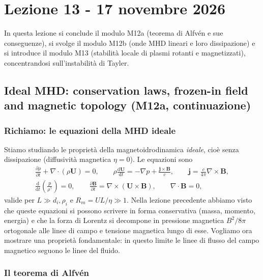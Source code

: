 \chapter{Lezione 13 - 17 novembre 2026}

In questa lezione si conclude il modulo M12a (teorema di Alfvén e sue conseguenze), si svolge il modulo M12b (onde MHD lineari e loro dissipazione) e si introduce il modulo M13 (stabilità locale di plasmi rotanti e magnetizzati), concentrandosi sull'instabilità di Tayler.

\section{Ideal MHD: conservation laws, frozen-in field and magnetic topology (M12a, continuazione)}

\subsection{Richiamo: le equazioni della MHD ideale}

Stiamo studiando le proprietà della magnetoidrodinamica \emph{ideale}, cioè senza dissipazione (diffusività magnetica $\eta=0$). Le equazioni sono
\begin{gather}
\frac{\partial\rho}{\partial t}+\nabla\cdot(\rho\mathbf{U})=0,\qquad
\rho\frac{\mathrm{d}\mathbf{U}}{\mathrm{d}t}=-\nabla p+\frac{\mathbf{j}\times\mathbf{B}}{c},\qquad
\mathbf{j}=\frac{c}{4\pi}\nabla\times\mathbf{B},\\
\frac{\mathrm{d}}{\mathrm{d}t}\left(\frac{p}{\rho^{\gamma}}\right)=0,\qquad
\frac{\partial\mathbf{B}}{\partial t}=\nabla\times(\mathbf{U}\times\mathbf{B}),\qquad
\nabla\cdot\mathbf{B}=0,
\end{gather}
valide per $L\gg d_i,\rho_i$ e $R_m=UL/\eta\gg1$. Nella lezione precedente abbiamo visto che queste equazioni si possono scrivere in forma conservativa (massa, momento, energia) e che la forza di Lorentz si decompone in pressione magnetica $B^2/8\pi$ ortogonale alle linee di campo e tensione magnetica lungo di esse. Vogliamo ora mostrare una proprietà fondamentale: in questo limite le linee di flusso del campo magnetico seguono le linee del fluido.

\subsection{Il teorema di Alfvén}

